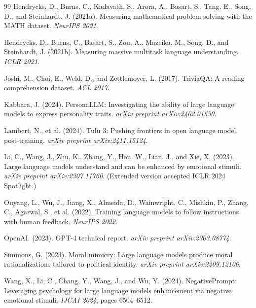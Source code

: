 \documentclass[11pt,a4paper]{article}
\begin{document}
\begin{thebibliography}{99}
Hendrycks, D., Burns, C., Kadavath, S., Arora, A., Basart, S., Tang, E., Song, D., and Steinhardt, J. (2021a).
\newblock Measuring mathematical problem solving with the MATH dataset.
\newblock \emph{NeurIPS 2021}.

Hendrycks, D., Burns, C., Basart, S., Zou, A., Mazeika, M., Song, D., and Steinhardt, J. (2021b).
\newblock Measuring massive multitask language understanding.
\newblock \emph{ICLR 2021}.

Joshi, M., Choi, E., Weld, D., and Zettlemoyer, L. (2017).
\newblock TriviaQA: A reading comprehension dataset.
\newblock \emph{ACL 2017}.

Kabbara, J. (2024).
\newblock PersonaLLM: Investigating the ability of large language models to express personality traits.
\newblock \emph{arXiv preprint arXiv:2402.01550}.

Lambert, N., et al. (2024).
\newblock Tulu 3: Pushing frontiers in open language model post-training.
\newblock \emph{arXiv preprint arXiv:2411.15124}.

Li, C., Wang, J., Zhu, K., Zhang, Y., Hou, W., Lian, J., and Xie, X. (2023).
\newblock Large language models understand and can be enhanced by emotional stimuli.
\newblock \emph{arXiv preprint arXiv:2307.11760}. (Extended version accepted ICLR 2024 Spotlight.)

Ouyang, L., Wu, J., Jiang, X., Almeida, D., Wainwright, C., Mishkin, P., Zhang, C., Agarwal, S., et al. (2022).
\newblock Training language models to follow instructions with human feedback.
\newblock \emph{NeurIPS 2022}.

OpenAI. (2023).
\newblock GPT-4 technical report.
\newblock \emph{arXiv preprint arXiv:2303.08774}.

Simmons, G. (2023).
\newblock Moral mimicry: Large language models produce moral rationalizations tailored to political identity.
\newblock \emph{arXiv preprint arXiv:2209.12106}.

Wang, X., Li, C., Chang, Y., Wang, J., and Wu, Y. (2024).
\newblock NegativePrompt: Leveraging psychology for large language models enhancement via negative emotional stimuli.
\newblock \emph{IJCAI 2024}, pages 6504--6512.


\end{thebibliography}
\end{document}
